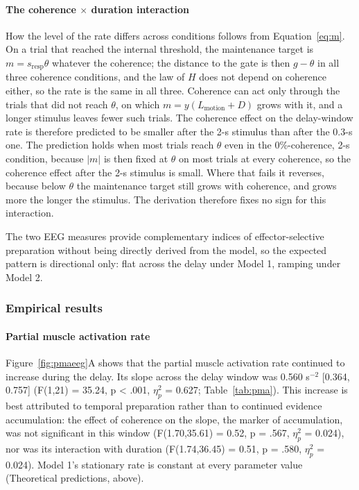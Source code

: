\documentclass[a4paper,11pt]{article}
\theoremstyle{definition}
\newcommand{\1}{\mathbbm{1}}
\begin{document}
\paragraph{The coherence $\times$ duration interaction}

How the level of the rate differs across conditions follows from Equation~\eqref{eq:m}. On a trial that reached the internal threshold, the maintenance target is $m=s_{\mathrm{resp}}\theta$ whatever the coherence; the distance to the gate is then $g-\theta$ in all three coherence conditions, and the law of $H$ does not depend on coherence either, so the rate is the same in all three. Coherence can act only through the trials that did not reach $\theta$, on which $m=y(L_{\mathrm{motion}}+D)$ grows with it, and a longer stimulus leaves fewer such trials. The coherence effect on the delay-window rate is therefore predicted to be smaller after the 2-s stimulus than after the 0.3-s one. The prediction holds when most trials reach $\theta$ even in the 0\%-coherence, 2-s condition, because $|m|$ is then fixed at $\theta$ on most trials at every coherence, so the coherence effect after the 2-s stimulus is small. Where that fails it reverses, because below $\theta$ the maintenance target still grows with coherence, and grows more the longer the stimulus. The derivation therefore fixes no sign for this interaction.

The two EEG measures provide complementary indices of effector-selective preparation without being directly derived from the model, so the expected pattern is directional only: flat across the delay under Model 1, ramping under Model 2.


\subsubsection{Empirical results}

\paragraph{Partial muscle activation rate}

Figure~\ref{fig:pmaeeg}A shows that the partial muscle activation rate continued to increase during the delay. Its slope across the delay window was 0.560 s$^{-2}$ [0.364, 0.757] (F(1,21) = 35.24, p < .001, $\eta_{p}^{2}$ = 0.627; Table~\ref{tab:pma}). This increase is best attributed to temporal preparation rather than to continued evidence accumulation: the effect of coherence on the slope, the marker of accumulation, was not significant in this window (F(1.70,35.61) = 0.52, p = .567, $\eta_{p}^{2}$ = 0.024), nor was its interaction with duration (F(1.74,36.45) = 0.51, p = .580, $\eta_{p}^{2}$ = 0.024). Model 1's stationary rate is constant at every parameter value (Theoretical predictions, above).
\end{document}
